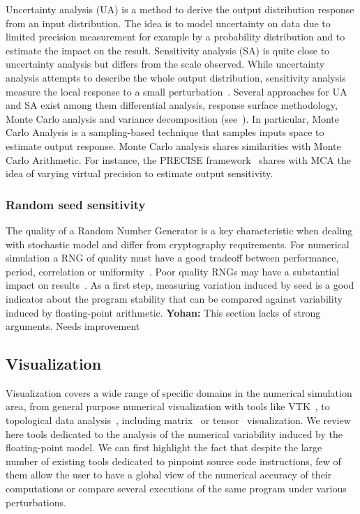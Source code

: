 \documentclass[11pt]{article}
\newcommand{\Yohan}[1]{\color{green!75!black}\textbf{Yohan:} #1\color{black}\xspace}
\begin{document}
Uncertainty analysis (UA) is a method to derive the output distribution response from an input distribution.
The idea is to model uncertainty on data due to limited precision measurement for example by a probability distribution and 
to estimate the impact on the result. 
Sensitivity analysis (SA) is quite close to uncertainty analysis but differs from the scale observed.
While uncertainty analysis attempts to describe the whole output distribution, sensitivity analysis 
measure the local response to a small perturbation~\cite{loucks2017water}. 
Several approaches for UA and SA exist among them differential analysis, response surface methodology, Monte Carlo analysis
and variance decomposition (see~\cite{helton2006survey}). In particular, Monte Carlo Analysis is a sampling-based technique
that samples inputs space to estimate output response. Monte Carlo analysis shares similarities with Monte Carlo Arithmetic. For instance, the PRECISE framework~\cite{chaitin1996lectures} shares with MCA the idea of varying virtual precision to estimate output sensitivity.

\subsubsection{Random seed sensitivity}

The quality of a Random Number Generator is a key characteristic when dealing with stochastic model and differ from cryptography requirements.
For numerical simulation a RNG of quality must have a good tradeoff between performance, period, correlation or uniformity~\cite{james2020review}.
Poor quality RNGs may have a substantial impact on results~\cite{click2011quality}. As a first step, measuring variation induced by seed is 
a good indicator about the program stability that can be compared against variability induced by floating-point arithmetic.
\Yohan{This section lacks of strong arguments. Needs improvement}

\subsection{Visualization}

Visualization covers a wide range of specific domains in the numerical simulation area, from general purpose numerical visualization with tools
like VTK~\cite{schroeder2000visualizing},
to topological data analysis~\cite{tierny2018topological}, including matrix~\cite{wu2008matrix} or tensor~\cite{kindlmann2006diffusion} visualization.
We review here tools dedicated to the analysis of the numerical variability induced by the floating-point model.
We can first highlight the fact that despite the large number of existing tools dedicated to pinpoint 
source code instructions, few of them allow the user to have a global view of the numerical accuracy of their computations
or compare several executions of the same program under various perturbations.
\end{document}
